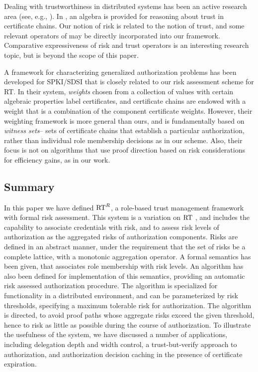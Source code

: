 Dealing with trustworthiness in distributed systems has been an active
research area (see, e.g., \cite{grandison-ieeecst00}). In
\cite{josang-ndss99}, an algebra is provided for reasoning about trust
in certificate chains. Our notion of risk is related to the notion of
trust, and some relevant operators of \cite{josang-ndss99} may be
directly incorporated into our framework.  Comparative expressiveness
of risk and trust operators is an interesting research topic, but is
beyond the scope of this paper.

A framework for characterizing generalized authorization problems has
been developed for SPKI/SDSI \cite{DBLP:conf/csfw/SchwoonJRS03} that
is closely related to our risk assessment scheme for RT.  In their
system, \emph{weights} chosen from a collection of values with certain
algebraic properties label certificates, and certificate chains are
endowed with a weight that is a combination of the component
certificate weights.  However, their weighting framework is more
general than ours, and is fundamentally based on \emph{witness sets}--
sets of certificate chains that establish a particular authorization,
rather than individual role membership decisions as in our scheme.
Also, their focus is not on algorithms that use proof direction based
on risk considerations for efficiency gains, as in our work.
  
\subsection{Summary}

In this paper we have defined $\text{RT}^R$, a role-based trust management
framework with formal risk assessment.  This system is a variation on
$\text{RT}$ \cite{Li:2003-04}, and includes the capability to associate
credentials with risk, and to assess risk levels of authorization as
the aggregated risks of authorization components.  Risks are defined
in an abstract manner, under the requirement that the set of risks be
a complete lattice, with a monotonic aggregation operator.  A formal
semantics has been given, that associates role membership with risk
levels.  An algorithm has also been defined for implementation of this
semantics, providing an automatic risk assessed authorization
procedure.  The algorithm is specialized for functionality in a
distributed environment, and can be parameterized by risk thresholds,
specifying a maximum tolerable risk for authorization.  The algorithm
is directed, to avoid proof paths whose aggregate risks exceed the
given threshold, hence to risk as little as possible during the course
of authorization.  To illustrate the usefulness of the system, we have
discussed a number of applications, including delegation depth and
width control, a trust-but-verify approach to authorization, and
authorization decision caching in the presence of certificate
expiration.
